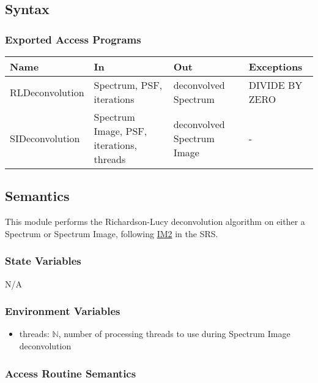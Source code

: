 \documentclass[12pt, titlepage]{article}
\begin{document}
\subsection{Syntax}

\subsubsection{Exported Access Programs}

\begin{center}
    \begin{tabular}{p{4cm} p{4cm} p{4cm} p{2cm}}
        \hline
        \textbf{Name} & \textbf{In} & \textbf{Out} & \textbf{Exceptions} \\
        \hline
        RLDeconvolution & Spectrum, PSF, iterations & deconvolved Spectrum & DIVIDE BY
        ZERO \\
        SIDeconvolution & Spectrum Image, PSF, iterations, threads & deconvolved
        Spectrum Image & - \\
        \hline
    \end{tabular}
\end{center}

\subsection{Semantics}
This module performs the Richardson-Lucy deconvolution algorithm on either a
Spectrum or Spectrum Image, following \hyperref[deconvolution]{IM2} in the SRS.

\subsubsection{State Variables}
N/A

\subsubsection{Environment Variables}
\begin{itemize}
    \item threads: $\mathbb{N}$, number of processing threads to use during
    Spectrum Image deconvolution
\end{itemize}

\subsubsection{Access Routine Semantics}
\end{document}
